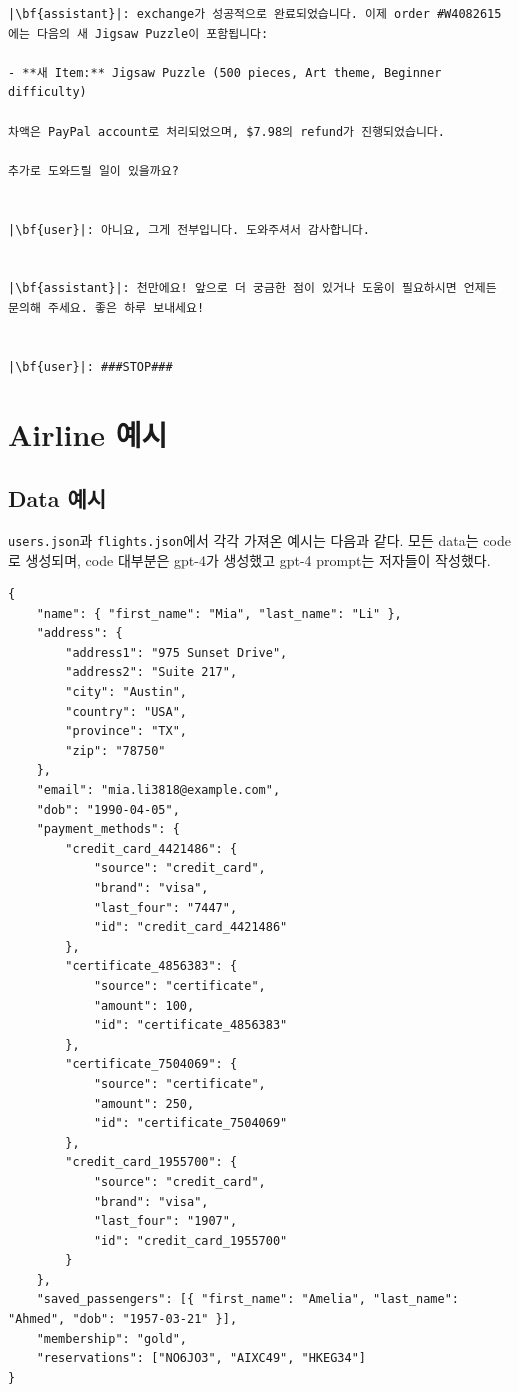 \begin{verbatim}
|\bf{assistant}|: exchange가 성공적으로 완료되었습니다. 이제 order #W4082615에는 다음의 새 Jigsaw Puzzle이 포함됩니다:

- **새 Item:** Jigsaw Puzzle (500 pieces, Art theme, Beginner difficulty)

차액은 PayPal account로 처리되었으며, $7.98의 refund가 진행되었습니다.

추가로 도와드릴 일이 있을까요?


|\bf{user}|: 아니요, 그게 전부입니다. 도와주셔서 감사합니다.


|\bf{assistant}|: 천만에요! 앞으로 더 궁금한 점이 있거나 도움이 필요하시면 언제든 문의해 주세요. 좋은 하루 보내세요!


|\bf{user}|: ###STOP###
\end{verbatim}

\newpage

\section{Airline 예시}

\subsection{Data 예시} \label{sec:airline_data}
\texttt{users.json}과 \texttt{flights.json}에서 각각 가져온 예시는 다음과 같다. 모든 data는 code로 생성되며, code 대부분은 gpt-4가 생성했고 gpt-4 prompt는 저자들이 작성했다.

\begin{listing}[ht]
\begin{verbatim}
{
    "name": { "first_name": "Mia", "last_name": "Li" },
    "address": {
        "address1": "975 Sunset Drive",
        "address2": "Suite 217",
        "city": "Austin",
        "country": "USA",
        "province": "TX",
        "zip": "78750"
    },
    "email": "mia.li3818@example.com",
    "dob": "1990-04-05",
    "payment_methods": {
        "credit_card_4421486": {
            "source": "credit_card",
            "brand": "visa",
            "last_four": "7447",
            "id": "credit_card_4421486"
        },
        "certificate_4856383": {
            "source": "certificate",
            "amount": 100,
            "id": "certificate_4856383"
        },
        "certificate_7504069": {
            "source": "certificate",
            "amount": 250,
            "id": "certificate_7504069"
        },
        "credit_card_1955700": {
            "source": "credit_card",
            "brand": "visa",
            "last_four": "1907",
            "id": "credit_card_1955700"
        }
    },
    "saved_passengers": [{ "first_name": "Amelia", "last_name": "Ahmed", "dob": "1957-03-21" }],
    "membership": "gold",
    "reservations": ["NO6JO3", "AIXC49", "HKEG34"]
}
\end{verbatim}
\caption{\airline{}의 users database entry 예시.}
\end{listing}

